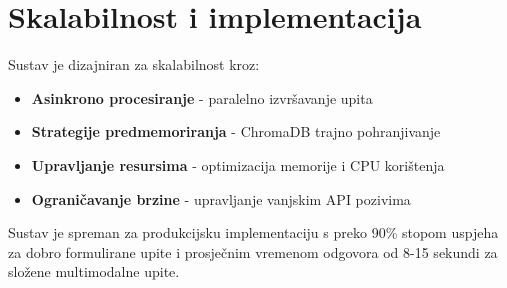 \section{Skalabilnost i implementacija}
\label{sec:scalability}

Sustav je dizajniran za skalabilnost kroz:
\begin{itemize}
    \item \textbf{Asinkrono procesiranje} - paralelno izvršavanje upita
    \item \textbf{Strategije predmemoriranja} - ChromaDB trajno pohranjivanje
    \item \textbf{Upravljanje resursima} - optimizacija memorije i CPU korištenja
    \item \textbf{Ograničavanje brzine} - upravljanje vanjskim API pozivima
\end{itemize}

Sustav je spreman za produkcijsku implementaciju s preko 90\% stopom uspjeha za dobro formulirane upite i prosječnim vremenom odgovora od 8-15 sekundi za složene multimodalne upite. 